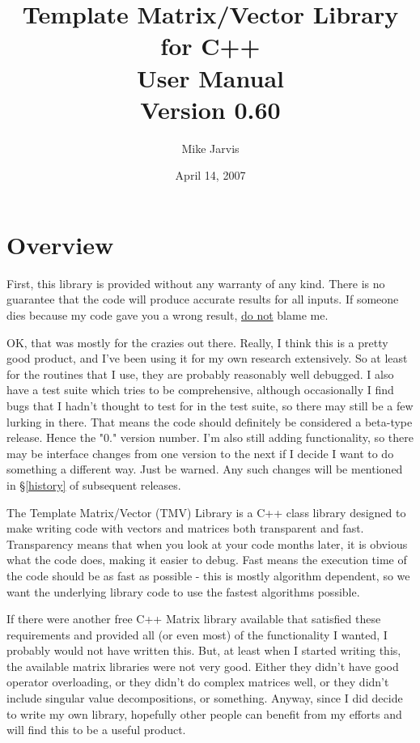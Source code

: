 \documentclass[twoside,letterpaper,11pt]{article}
\newcommand{\tmvversion}{0.60}
\begin{document}
\title{Template Matrix/Vector Library for C++ \\ User Manual \\ Version \tmvversion}
\author{Mike Jarvis}
\date{April 14, 2007}
\maketitle


\newpage
\section{Overview}

First, this library is provided without any warranty of any kind.  There is no guarantee
that the code will produce accurate results for all inputs.  If someone dies because
my code gave you a wrong result, \underline{do not} blame me.

OK, that was mostly for the crazies out there.  Really, I think this is a pretty good 
product, and I've been using it for my own research extensively.  So at least 
for the routines that I use, they are probably reasonably well debugged.
I also have a test suite which tries to be comprehensive, although
occasionally I find bugs that I hadn't thought to test for in the test suite, so 
there may still be a few lurking in there.  That means the code should definitely be considered
a beta-type release.  Hence the "0." version number.  I'm also still adding functionality,
so there may be interface changes from one version to the next if I decide I 
want to do something a different way.  Just be warned.  Any such changes will be 
mentioned in \S\ref{history} of subsequent releases.

The Template Matrix/Vector (TMV) Library is a C++ class library designed to make
writing code with vectors and matrices both transparent and fast.  Transparency 
means that when you look at your code months later, it is obvious what the code
does, making it easier to debug.  Fast means the execution time of the code should
be as fast as possible - this is mostly algorithm dependent, so we want the 
underlying library code to use the fastest algorithms possible.

If there were another free C++ Matrix library available that satisfied these requirements
and provided all (or even most) of the functionality I wanted, I probably would
not have written this.  But, at least when I started writing this, the available matrix libraries
were not very good.  Either they didn't have good operator overloading, or they 
didn't do complex matrices well, or they didn't include singular value decompositions,
or something.  Anyway, since I did decide to write 
my own library, hopefully other people can benefit from my efforts and will find 
this to be a useful product.
\end{document}
